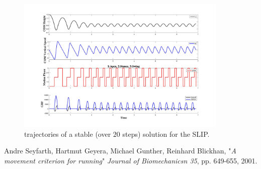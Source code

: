 \documentclass[11pt]{article}
\begin{document}
\begin{figure}[h!]
    \centering
    \includegraphics[width=0.9\textwidth]{screens/run_1.jpg}
    \caption{trajectories of a stable (over $20$ steps) solution for the SLIP.}
\end{figure}

\begin{thebibliography}{1}

     Andre Seyfarth, Hartmut Geyera, Michael Gunther, Reinhard Blickhan, "\textit{A movement criterion for running}" \emph{Journal of Biomechanicsn 35}, pp. 649-655, 2001.

\end{thebibliography}
\end{document}
